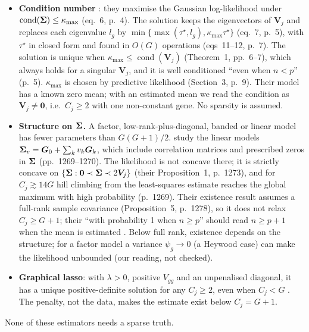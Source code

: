 \documentclass[11pt,a4paper]{article}
\begin{document}
\begin{idbox}[title={Identifiability: covariance versus network}]
\begin{itemize}
        $\bm V_j\neq\bm 0$.
  \item \textbf{Condition number} \parencite{wonConditionnumberregularizedCovarianceEstimation2013}: they maximise the Gaussian log-likelihood under
        $\operatorname{cond}(\bm{\Sigma})\le\kappa_{\max}$ (eq.~6, p.~4). The solution keeps the eigenvectors of
        $\bm V_j$ and replaces each eigenvalue $l_g$ by $\min\{\max(\tau^\star,l_g),\kappa_{\max}\tau^\star\}$
        (eq.~7, p.~5), with $\tau^\star$ in closed form and found in $O(G)$ operations (eqs~11--12, p.~7). The
        solution is unique when $\kappa_{\max}\le\operatorname{cond}(\bm V_j)$ (Theorem~1, pp.~6--7), which
        always holds for a singular $\bm V_j$, and it is well conditioned \enquote{even when $n<p$} (p.~5).
        $\kappa_{\max}$ is chosen by predictive likelihood (Section~3, p.~9). Their model has a known zero
        mean; with an estimated mean we read the condition as $\bm V_j\neq\bm 0$, i.e.\ $C_j\ge2$ with one
        non-constant gene. No sparsity is assumed.
  \item \textbf{Structure on $\bm{\Sigma}$.} A factor, low-rank-plus-diagonal, banded or linear model has fewer
        parameters than $G(G+1)/2$. \parencite{zwiernikMaximumLikelihoodEstimation2017} study the linear models $\bm{\Sigma}_v=\bm G_0+\sum_kv_k\bm G_k$, which include
        correlation matrices and prescribed zeros in $\bm{\Sigma}$ (pp.~1269--1270). The likelihood is not
        concave there; it is strictly concave on $\{\bm{\Sigma}:\bm 0\prec\bm{\Sigma}\prec2\bm V_j\}$ (their
        Proposition~1, p.~1273), and for $C_j\gtrsim14G$ hill climbing from the least-squares estimate reaches
        the global maximum with high probability (p.~1269). Their existence result assumes a full-rank sample
        covariance (Proposition~5, p.~1278), so it does not relax $C_j\ge G+1$; their \enquote{with probability
        1 when $n\geqslant p$} should read $n\ge p+1$ when the mean is estimated . Below full rank,
        existence depends on the structure; for a factor model a variance $\psi_g\to0$ (a Heywood case) can
        make the likelihood unbounded (our reading, not checked).
  \item \textbf{Graphical lasso}: with $\lambda>0$, positive $V_{gg}$ and an unpenalised diagonal, it has a
        unique positive-definite solution for any $C_j\ge2$, even when $C_j<G$
        \parencite{carterExistencePenalisedLikelihood2025}. The penalty, not the data, makes the estimate
        exist below $C_j=G+1$.
\end{itemize}
None of these estimators needs a sparse truth.


\end{idbox}
\end{document}
